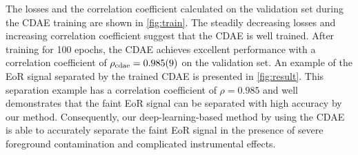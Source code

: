 \documentclass[letters,a4paper,fleqn,usenatbib]{mnras}
\newcommand{\R}[1]{\mathrm{#1}}
\begin{document}
The losses and the correlation coefficient calculated on the validation
set during the CDAE training are shown in \autoref{fig:train}.
The steadily decreasing losses and increasing correlation coefficient
suggest that the CDAE is well trained.
After training for 100 epochs, the CDAE achieves excellent performance
with a correlation coefficient of $\rho_{\R{cdae}} = \num{0.985 +- 0.009}$
on the validation set.
An example of the EoR signal separated by the trained CDAE is presented
in \autoref{fig:result}.
This separation example has a correlation coefficient of $\rho = 0.985$
and well demonstrates that the faint EoR signal can be separated with
high accuracy by our method.
Consequently, our deep-learning-based method by using the CDAE is able
to accurately separate the faint EoR signal in the presence of severe
foreground contamination and complicated instrumental effects.
\end{document}
